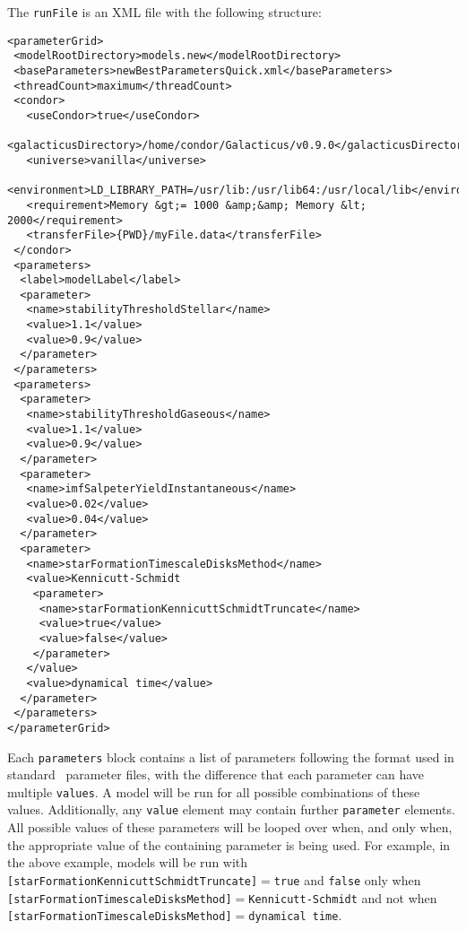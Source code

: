 The {\tt runFile} is an XML file with the following structure:
\begin{verbatim}
<parameterGrid>
 <modelRootDirectory>models.new</modelRootDirectory>
 <baseParameters>newBestParametersQuick.xml</baseParameters>
 <threadCount>maximum</threadCount>
 <condor>
   <useCondor>true</useCondor>
   <galacticusDirectory>/home/condor/Galacticus/v0.9.0</galacticusDirectory>
   <universe>vanilla</universe>
   <environment>LD_LIBRARY_PATH=/usr/lib:/usr/lib64:/usr/local/lib</environment>
   <requirement>Memory &gt;= 1000 &amp;&amp; Memory &lt; 2000</requirement>
   <transferFile>{PWD}/myFile.data</transferFile>
 </condor>
 <parameters>
  <label>modelLabel</label>
  <parameter>
   <name>stabilityThresholdStellar</name>
   <value>1.1</value>
   <value>0.9</value>
  </parameter>
 </parameters>
 <parameters>
  <parameter>
   <name>stabilityThresholdGaseous</name>
   <value>1.1</value>
   <value>0.9</value>
  </parameter>
  <parameter>
   <name>imfSalpeterYieldInstantaneous</name>
   <value>0.02</value>
   <value>0.04</value>
  </parameter>
  <parameter>
   <name>starFormationTimescaleDisksMethod</name>
   <value>Kennicutt-Schmidt
    <parameter>
     <name>starFormationKennicuttSchmidtTruncate</name>
     <value>true</value>
     <value>false</value>
    </parameter>
   </value>
   <value>dynamical time</value>
  </parameter>
 </parameters>
</parameterGrid>
\end{verbatim}
Each {\tt parameters} block contains a list of parameters following the format used in standard \glc\ parameter files, with the difference that each parameter can have multiple {\tt values}. A model will be run for all possible combinations of these values. Additionally, any {\tt value} element may contain further {\tt parameter} elements. All possible values of these parameters will be looped over when, and only when, the appropriate value of the containing parameter is being used. For example, in the above example, models will be run with {\tt [starFormationKennicuttSchmidtTruncate]}$=${\tt true} and {\tt false} only when {\tt [starFormationTimescaleDisksMethod]}$=${\tt Kennicutt-Schmidt} and not when {\tt [starFormationTimescaleDisksMethod]}$=${\tt dynamical time}.

